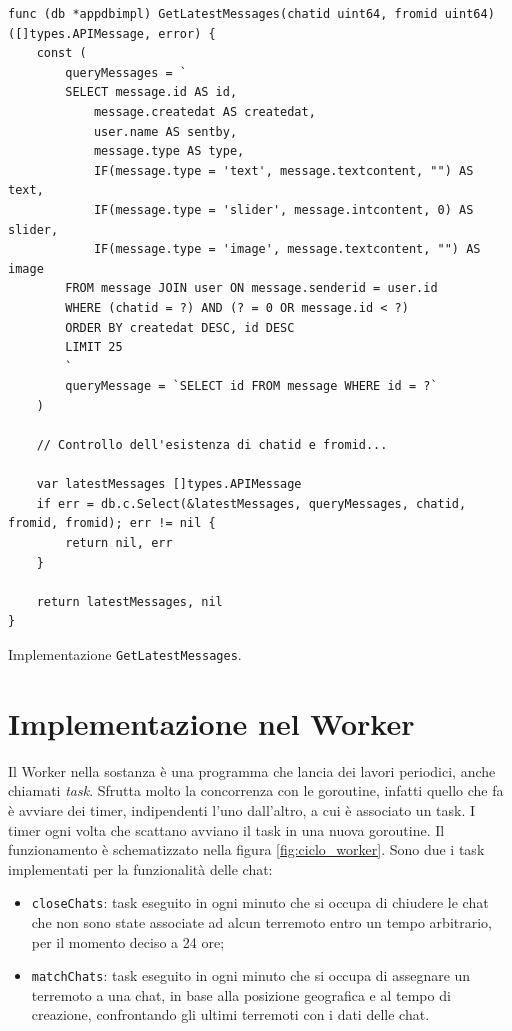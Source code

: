 \begin{longlisting}
\begin{verbatim}
func (db *appdbimpl) GetLatestMessages(chatid uint64, fromid uint64) ([]types.APIMessage, error) {
	const (
		queryMessages = `
		SELECT message.id AS id,
			message.createdat AS createdat,
			user.name AS sentby,
			message.type AS type,
			IF(message.type = 'text', message.textcontent, "") AS text,
			IF(message.type = 'slider', message.intcontent, 0) AS slider,
			IF(message.type = 'image', message.textcontent, "") AS image
		FROM message JOIN user ON message.senderid = user.id
		WHERE (chatid = ?) AND (? = 0 OR message.id < ?)
		ORDER BY createdat DESC, id DESC
		LIMIT 25
		`
		queryMessage = `SELECT id FROM message WHERE id = ?`
	)

	// Controllo dell'esistenza di chatid e fromid...

	var latestMessages []types.APIMessage
	if err = db.c.Select(&latestMessages, queryMessages, chatid, fromid, fromid); err != nil {
		return nil, err
	}

	return latestMessages, nil
}
\end{verbatim}
\caption{Implementazione \texttt{GetLatestMessages}.}
\label{listing:impl_db}
\end{longlisting}

\section{Implementazione nel Worker}

Il Worker nella sostanza è una programma che lancia dei lavori periodici, anche chiamati \textit{task}. Sfrutta molto la concorrenza con le goroutine, infatti quello che fa è avviare dei timer, indipendenti l'uno dall'altro, a cui è associato un task. I timer ogni volta che scattano avviano il task in una nuova goroutine. Il funzionamento è schematizzato nella figura \ref{fig:ciclo_worker}. Sono due i task implementati per la funzionalità delle chat:

\begin{itemize}
\item \texttt{closeChats}: task eseguito in ogni minuto che si occupa di chiudere le chat che non sono state associate ad alcun terremoto entro un tempo arbitrario, per il momento deciso a 24 ore;
\item \texttt{matchChats}: task eseguito in ogni minuto che si occupa di assegnare un terremoto a una chat, in base alla posizione geografica e al tempo di creazione, confrontando gli ultimi terremoti con i dati delle chat.
\end{itemize}

